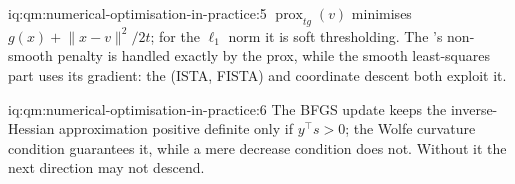 \begin{solution}{iq:qm:numerical-optimisation-in-practice:5}
$\operatorname{prox}_{tg}(v)$ minimises $g(x) + \lVert x - v\rVert^2/2t$; for the $\ell_1$ norm it is soft thresholding. The 's non-smooth penalty is handled exactly by the prox, while the smooth
least-squares part uses its gradient: the  (ISTA, FISTA) and coordinate descent both exploit it.
\end{solution}

\begin{solution}{iq:qm:numerical-optimisation-in-practice:6}
The BFGS update keeps the inverse-Hessian approximation positive definite only if $y^\top s > 0$; the Wolfe curvature condition guarantees it, while a mere decrease condition does not. Without it
the next direction may not descend.
\end{solution}

